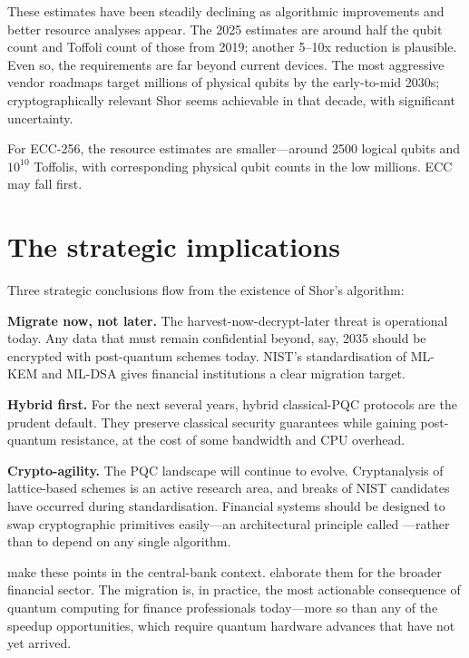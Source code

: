 These estimates have been steadily declining as algorithmic improvements and better resource analyses appear. The 2025 estimates are around half the qubit count and Toffoli count of those from 2019; another 5--10x reduction is plausible. Even so, the requirements are far beyond current devices. The most aggressive vendor roadmaps target millions of physical qubits by the early-to-mid 2030s; cryptographically relevant Shor seems achievable in that decade, with significant uncertainty.

For ECC-256, the resource estimates are smaller---around 2500 logical qubits and $10^{10}$ Toffolis, with corresponding physical qubit counts in the low millions. ECC may fall first.

\section{The strategic implications}

Three strategic conclusions flow from the existence of Shor's algorithm:

\textbf{Migrate now, not later.} The harvest-now-decrypt-later threat is operational today. Any data that must remain confidential beyond, say, 2035 should be encrypted with post-quantum schemes today. NIST's standardisation of ML-KEM and ML-DSA \citep{nist_fips203_2024} gives financial institutions a clear migration target.

\textbf{Hybrid first.} For the next several years, hybrid classical-PQC protocols are the prudent default. They preserve classical security guarantees while gaining post-quantum resistance, at the cost of some bandwidth and CPU overhead.

\textbf{Crypto-agility.} The PQC landscape will continue to evolve. Cryptanalysis of lattice-based schemes is an active research area, and breaks of NIST candidates have occurred during standardisation. Financial systems should be designed to swap cryptographic primitives easily---an architectural principle called ---rather than to depend on any single algorithm.

\citet{auer_quantum_2024} make these points in the central-bank context. \citet{gong_quantum_2026-1} elaborate them for the broader financial sector. The migration is, in practice, the most actionable consequence of quantum computing for finance professionals today---more so than any of the speedup opportunities, which require quantum hardware advances that have not yet arrived.

